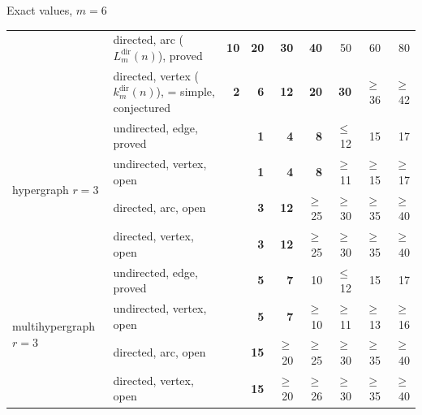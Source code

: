 \documentclass[aspectratio=1610,11pt]{beamer}
\begin{document}
\begin{frame}{Exact values, $m=6$}
{\begin{tabular}{llrrrrrrr}
 & directed, arc ($L_m^{\mathrm{dir}}(n)$), \textcolor{vtProved}{proved} & \textcolor{vtExact}{\textbf{10}} & \textcolor{vtExact}{\textbf{20}} & \textcolor{vtExact}{\textbf{30}} & \textcolor{vtExact}{\textbf{40}} & \textcolor{vtProved}{50} & \textcolor{vtProved}{60} & \textcolor{vtProved}{80} \\
 & directed, vertex ($k_m^{\mathrm{dir}}(n)$), \textcolor{vtConjectured}{= simple, conjectured} & \textcolor{vtExact}{\textbf{2}} & \textcolor{vtExact}{\textbf{6}} & \textcolor{vtExact}{\textbf{12}} & \textcolor{vtExact}{\textbf{20}} & \textcolor{vtExact}{\textbf{30}} & \textcolor{vtConjectured}{$\ge$36} & \textcolor{vtConjectured}{$\ge$42} \\
\midrule
\multirow{4}{*}{hypergraph $r=3$} & undirected, edge, \textcolor{vtProved}{proved} &  & \textcolor{vtExact}{\textbf{1}} & \textcolor{vtExact}{\textbf{4}} & \textcolor{vtExact}{\textbf{8}} & \textcolor{vtProved}{$\le$12} & \textcolor{vtProved}{15} & \textcolor{vtProved}{17} \\
 & undirected, vertex, \textcolor{vtOpen}{open} &  & \textcolor{vtExact}{\textbf{1}} & \textcolor{vtExact}{\textbf{4}} & \textcolor{vtExact}{\textbf{8}} & \textcolor{vtOpen}{$\ge$11} & \textcolor{vtOpen}{$\ge$15} & \textcolor{vtOpen}{$\ge$17} \\
 & directed, arc, \textcolor{vtOpen}{open} &  & \textcolor{vtExact}{\textbf{3}} & \textcolor{vtExact}{\textbf{12}} & \textcolor{vtOpen}{$\ge$25} & \textcolor{vtOpen}{$\ge$30} & \textcolor{vtOpen}{$\ge$35} & \textcolor{vtOpen}{$\ge$40} \\
 & directed, vertex, \textcolor{vtOpen}{open} &  & \textcolor{vtExact}{\textbf{3}} & \textcolor{vtExact}{\textbf{12}} & \textcolor{vtOpen}{$\ge$25} & \textcolor{vtOpen}{$\ge$30} & \textcolor{vtOpen}{$\ge$35} & \textcolor{vtOpen}{$\ge$40} \\
\midrule
\multirow{4}{*}{multihypergraph $r=3$} & undirected, edge, \textcolor{vtProved}{proved} &  & \textcolor{vtExact}{\textbf{5}} & \textcolor{vtExact}{\textbf{7}} & \textcolor{vtProved}{10} & \textcolor{vtProved}{$\le$12} & \textcolor{vtProved}{15} & \textcolor{vtProved}{17} \\
 & undirected, vertex, \textcolor{vtOpen}{open} &  & \textcolor{vtExact}{\textbf{5}} & \textcolor{vtExact}{\textbf{7}} & \textcolor{vtOpen}{$\ge$10} & \textcolor{vtOpen}{$\ge$11} & \textcolor{vtOpen}{$\ge$13} & \textcolor{vtOpen}{$\ge$16} \\
 & directed, arc, \textcolor{vtOpen}{open} &  & \textcolor{vtExact}{\textbf{15}} & \textcolor{vtOpen}{$\ge$20} & \textcolor{vtOpen}{$\ge$25} & \textcolor{vtOpen}{$\ge$30} & \textcolor{vtOpen}{$\ge$35} & \textcolor{vtOpen}{$\ge$40} \\
 & directed, vertex, \textcolor{vtOpen}{open} &  & \textcolor{vtExact}{\textbf{15}} & \textcolor{vtOpen}{$\ge$20} & \textcolor{vtOpen}{$\ge$26} & \textcolor{vtOpen}{$\ge$30} & \textcolor{vtOpen}{$\ge$35} & \textcolor{vtOpen}{$\ge$40} \\
\bottomrule
\end{tabular}}
\end{frame}
\end{document}
